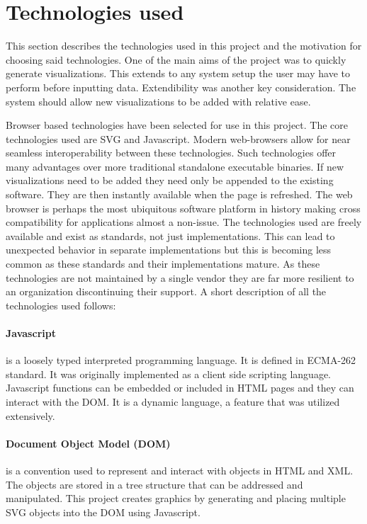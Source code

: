 \documentclass[a4paper, 11pt, titlepage, onehalfspacing]{report}
\begin{document}
\section{Technologies used}
This section describes the technologies used in this project and the motivation for choosing said technologies. One of the main aims of the project was to quickly generate visualizations. This extends to any system setup the user may have to perform before inputting data. Extendibility was another key consideration. The system should allow new visualizations to be added with relative ease.



Browser based technologies have been selected for use in this project. The core technologies used are SVG and Javascript. Modern web-browsers allow for near seamless interoperability between these technologies. Such technologies offer many advantages over more traditional standalone executable binaries. If new visualizations need to be added they need only be appended to the existing software. They are then instantly available when the page is refreshed. The web browser is perhaps the most ubiquitous software platform in history making cross compatibility for applications almost a non-issue. The technologies used are freely available and exist as standards, not just implementations. This can lead to unexpected behavior in separate implementations but this is becoming less common as these standards and their implementations mature. As these technologies are not maintained by a single vendor they are far more resilient to an organization discontinuing their support. A short description of all the technologies used follows:

\paragraph{Javascript}is a loosely typed interpreted programming language. It is defined in ECMA-262 standard. It was originally implemented as a client side scripting language. Javascript functions can be embedded or included in HTML pages and they can interact with the DOM. It is a dynamic language, a feature that was utilized extensively.

\paragraph{Document Object Model (DOM)}is a convention used to represent and interact with objects in HTML and XML. The objects are stored in a tree structure that can be addressed and manipulated. This project creates graphics by generating and placing multiple SVG objects into the DOM using Javascript.
\end{document}

